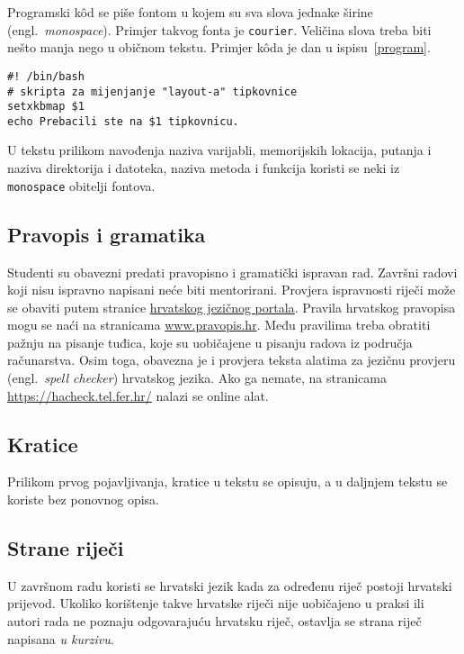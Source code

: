 Programski k\^od se piše fontom u kojem su sva slova jednake širine (engl.~\textit{monospace}). Primjer takvog fonta je \texttt{courier}. %
Veličina slova treba biti nešto manja nego u običnom tekstu. Primjer k\^oda je dan u ispisu~\ref{program}.
%

\begin{lstlisting}[caption={Skripta za mijenjanje rasporeda tipki tipkovnice}, label=program]
#! /bin/bash
# skripta za mijenjanje "layout-a" tipkovnice
setxkbmap $1
echo Prebacili ste na $1 tipkovnicu.
\end{lstlisting}

U tekstu prilikom navođenja naziva varijabli, memorijskih lokacija, putanja i naziva direktorija i datoteka, naziva metoda i funkcija koristi se neki iz \texttt{monospace} obitelji fontova.
\subsection{Pravopis i gramatika}

Studenti su obavezni predati pravopisno i gramatički ispravan rad. Završni radovi koji nisu ispravno napisani neće biti mentorirani. Provjera ispravnosti riječi može se obaviti putem stranice \href{http://hjp.znanje.hr/}{hrvatskog jezičnog portala}. Pravila hrvatskog pravopisa mogu se naći na stranicama \href{www.pravopis.hr}{www.pravopis.hr}. Među pravilima treba obratiti pažnju na pisanje tuđica, koje su uobičajene u pisanju radova iz područja računarstva. Osim toga, obavezna je i provjera teksta alatima za jezičnu provjeru (engl.~\textit{spell checker}) hrvatskog jezika. Ako ga nemate, na stranicama \url{https://hacheck.tel.fer.hr/} nalazi se online alat.
\subsection{Kratice}

Prilikom prvog pojavljivanja, kratice u tekstu se opisuju, a u daljnjem tekstu se koriste bez ponovnog opisa. 

\subsection{Strane riječi}
U završnom radu koristi se hrvatski jezik kada za određenu riječ postoji hrvatski prijevod. Ukoliko korištenje takve hrvatske riječi nije 
uobičajeno u praksi ili autori rada ne 
poznaju odgovarajuću hrvatsku riječ, ostavlja se strana riječ napisana \textit{u kurzivu}.

